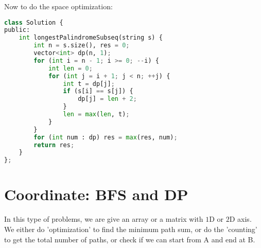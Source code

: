 \documentclass[../main.tex]{subfiles}
\begin{document}
\begin{examples}[resume]
Now to do the space optimization:
\begin{lstlisting}[language = Python]
class Solution {
public:
    int longestPalindromeSubseq(string s) {
        int n = s.size(), res = 0;
        vector<int> dp(n, 1);
        for (int i = n - 1; i >= 0; --i) {
            int len = 0;
            for (int j = i + 1; j < n; ++j) {
                int t = dp[j];
                if (s[i] == s[j]) {
                    dp[j] = len + 2;
                } 
                len = max(len, t);
            }
        }
        for (int num : dp) res = max(res, num);
        return res;
    }
};
\end{lstlisting}
\end{examples}
\section{Coordinate: BFS and DP}
\label{sec_coordinate}
In this type of problems, we are give an array or a matrix with $1$D or $2$D axis. We either do 'optimization' to find the minimum path sum, or do the 'counting' to get the total number of paths, or check if we can start from A and end at B. %
\end{document}

